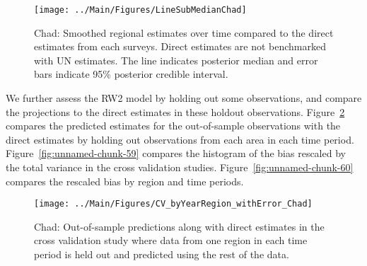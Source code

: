 \documentclass[12pt]{article}\usepackage[]{graphicx}\usepackage[]{color}
\newenvironment{knitrout}{}{} %
\begin{document}
\begin{knitrout}
\color{fgcolor}\begin{figure}[bht]

{\centering \texttt{[image: ../Main/Figures/LineSubMedianChad]} 

}

\caption[Chad]{Chad: Smoothed regional estimates over time compared to the direct estimates from each surveys. Direct estimates are not benchmarked with UN estimates. The line indicates posterior median and error bars indicate 95\% posterior credible interval.}\label{fig:unnamed-chunk-57}
\end{figure}


\end{knitrout}
We further assess the RW2 model by holding out some observations, and compare the projections to the direct estimates in these holdout observations. Figure~\ref{fig:unnamed-chunk-58} compares the predicted estimates for the out-of-sample observations  with the direct estimates by holding out observations from each area in each time period.  Figure~\ref{fig:unnamed-chunk-59} compares the histogram of the bias rescaled by the total variance in the cross validation studies. Figure~\ref{fig:unnamed-chunk-60} compares the rescaled bias by region and time periods.



 
\begin{knitrout}
\color{fgcolor}\begin{figure}[bht]

{\centering \texttt{[image: ../Main/Figures/CV\_byYearRegion\_withError\_Chad]} 

}

\caption[Chad]{Chad: Out-of-sample predictions along with direct estimates in the cross validation study where data from one region in each time period is held out and predicted using the rest of the data.}\label{fig:unnamed-chunk-58}
\end{figure}


\end{knitrout}
\end{document}
